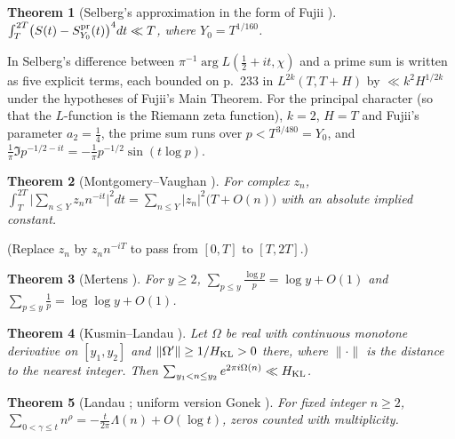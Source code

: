 \documentclass[preprint,12pt]{elsarticle}
\numberwithin{equation}{section}
\theoremstyle{plain}
\newtheorem{theorem}{Theorem}[section]
\theoremstyle{definition}
\theoremstyle{remark}
\begin{document}
\begin{theorem}[Selberg's approximation in the form of Fujii {\cite[\S3, pp.~232--233]{Fujii1974}}]\label{thm:known_selberg_approx}
$\int_T^{2T}\bigl(S(t)-S^{\rm pr}_{Y_0}(t)\bigr)^4dt\ll T$, where $Y_0=T^{1/160}$.
\end{theorem}
In \cite[\S3]{Fujii1974} Selberg's difference between $\pi^{-1}\arg L(\frac12+it,\chi)$ and a prime sum is written as five explicit terms, each bounded on p.~233 in $L^{2k}(T,T+H)$ by $\ll k^2H^{1/2k}$ under the hypotheses of Fujii's Main Theorem. For the principal character (so that the $L$-function is the Riemann zeta function), $k=2$, $H=T$ and Fujii's parameter $a_2=\frac14$, the prime sum runs over $p<T^{3/480}=Y_0$, and $\frac1\pi\Im p^{-1/2-it}=-\frac1\pi p^{-1/2}\sin(t\log p)$.

\begin{theorem}[Montgomery--Vaughan {\cite[Cor.~3]{MontgomeryVaughan1974}}]\label{thm:known_MV}
For complex $z_n$, $\int_T^{2T}\bigl|\sum_{n\le Y}z_nn^{-it}\bigr|^2dt=\sum_{n\le Y}|z_n|^2\bigl(T+O(n)\bigr)$ with an absolute implied constant.
\end{theorem}
(Replace $z_n$ by $z_nn^{-iT}$ to pass from $[0,T]$ to $[T,2T]$.)

\begin{theorem}[Mertens {\cite{Mertens1874}}]\label{thm:known_mertens}
For $y\ge2$, $\sum_{p\le y}\frac{\log p}p=\log y+O(1)$ and $\sum_{p\le y}\frac1p=\log\log y+O(1)$.
\end{theorem}

\begin{theorem}[Kusmin--Landau {\cite[Thm.~2.1]{GrahamKolesnik1991}}]\label{thm:known_KL}
Let $\Omega$ be real with continuous monotone derivative on $[y_1,y_2]$ and $\|\Omega'\|\ge1/H_{\rm KL}>0$ there, where $\|\cdot\|$ is the distance to the nearest integer. Then $\sum_{y_1<n\le y_2}e^{2\pi i\Omega(n)}\ll H_{\rm KL}$.
\end{theorem}

\begin{theorem}[Landau {\cite{Landau1912}}; uniform version Gonek {\cite{Gonek1993}}]\label{thm:known_landau}
For fixed integer $n\ge2$, $\sum_{0<\gamma\le t}n^{\rho}=-\frac t{2\pi}\Lambda(n)+O(\log t)$, zeros counted with multiplicity.
\end{theorem}
\end{document}
